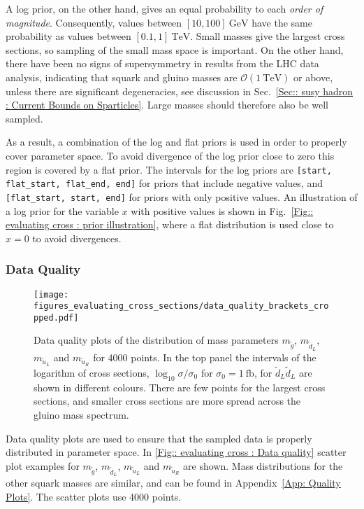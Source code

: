 \documentclass[twoside,english]{uiofysmaster}
\begin{document}
{{A log prior, on the other hand, gives an equal probability to each \textit{order of magnitude}. Consequently, values between $[10,100]~\mathrm{GeV}$ have the same probability as values between $[0.1,1]~\mathrm{TeV}$. Small masses give the largest cross sections, so sampling of the small mass space is important. On the other hand, there have been no signs of supersymmetry in results from the LHC data analysis, indicating that squark and gluino masses are $\mathcal{O}(1~\mathrm{TeV})$ or above, unless there are significant degeneracies, see discussion in Sec.~\ref{Sec:: susy hadron : Current Bounds on Sparticles}. Large masses should therefore also be well sampled. 

As a result, a combination of the log and flat priors is used in order to properly cover parameter space. To avoid divergence of the log prior close to zero this region is covered by a flat prior. The intervals for the log priors are \verb|[start, flat_start, flat_end, end]| for priors that include negative values, and \verb|[flat_start, start, end]| for priors with only positive values. An illustration of a log prior for the variable $x$ with positive values is shown in Fig.~\ref{Fig:: evaluating cross : prior illustration}, where a flat distribution is used close to $x=0$ to avoid divergences.

\subsubsection{Data Quality}\label{Sec:: evaluating cross : Data Quality}

\begin{figure}
\centering
\texttt{[image: figures\_evaluating\_cross\_sections/data\_quality\_brackets\_cropped.pdf]}
\caption[Data quality plots]{Data quality plots of the distribution of mass parameters $m_{\widetilde{g}}$, $m_{\widetilde{d}_L}$, $m_{\widetilde{u}_L}$ and $m_{\widetilde{u}_R}$ for 4000 points. In the top panel the intervals of the logarithm of cross sections, $ \log_{10} \sigma/\sigma_0$ for $\sigma_0 = 1~\mathrm{fb}$, for $\widetilde{d}_L \widetilde{d}_L$ are shown in different colours. There are few points for the largest cross sections, and smaller cross sections are more spread across the gluino mass spectrum. }
\label{Fig:: evaluating cross : Data quality}
\end{figure}

Data quality plots are used to ensure that the sampled data is properly distributed in parameter space. In \autoref{Fig:: evaluating cross : Data quality} scatter plot examples for $m_{\widetilde{g}}$, $m_{\widetilde{d}_L}$, $m_{\widetilde{u}_L}$ and $m_{\widetilde{u}_R}$ are shown. Mass distributions for the other squark masses are similar, and can be found in Appendix~\ref{App: Quality Plots}. The scatter plots use 4000 points. 

}}
\end{document}
